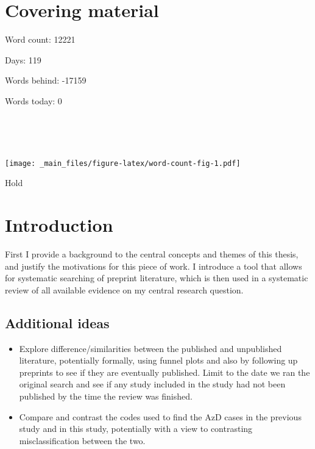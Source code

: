 \documentclass[a4paper, twoside]{templates/ociamthesis}
\providecommand{\tightlist}{%
  \setlength{\itemsep}{0pt}\setlength{\parskip}{0pt}}
\begin{document}
\flushbottom

\hypertarget{covering-material}{%
\chapter*{Covering material}\label{covering-material}}

\adjustmtc

Word count: 12221

Days: 119

Words behind: -17159

Words today: 0

~

~

\texttt{[image: \_main\_files/figure-latex/word-count-fig-1.pdf]}

\begin{savequote}
Hold
\end{savequote}



\hypertarget{intro-heading}{%
\chapter{Introduction}\label{intro-heading}}

\minitoc 

First I provide a background to the central concepts and themes of this thesis, and justify the motivations for this piece of work. I introduce a tool that allows for systematic searching of preprint literature, which is then used in a systematic review of all available evidence on my central research question.

\hypertarget{additional-ideas}{%
\section{Additional ideas}\label{additional-ideas}}

\begin{itemize}
\tightlist
\item
  Explore difference/similarities between the published and unpublished literature, potentially formally, using funnel plots and also by following up preprints to see if they are eventually published. Limit to the date we ran the original search and see if any study included in the study had not been published by the time the review was finished.
\item
  Compare and contrast the codes used to find the AzD cases in the previous study and in this study, potentially with a view to contrasting misclassification between the two.
\end{itemize}
\end{document}

